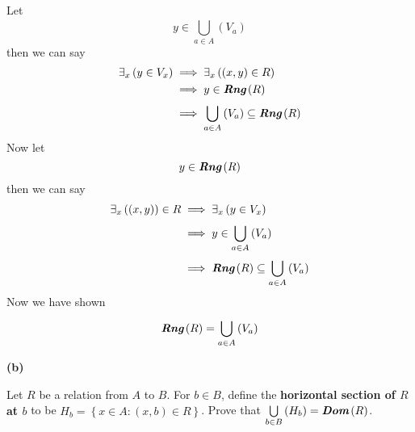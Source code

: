 \documentclass{article}
\newcommand{\sectionheading}[1]{\noindent\textbf{#1}

}
\let\bigunion\bigcup
\newcommand{\unionfrom}[3]{\bigunion\limits_{#1}^{#2} \left( {#3} \right)}
\newcommand{\unionacross}[2]{\unionfrom{#1}{}{#2}}
\newcommand{\set}[1]{\left\{ {#1} \right\}}
\newcommand{\setbuilder}[2]{\set{#1 : #2}}
\newcommand{\Exists}[2]{\exists_{#1}\left( {#2} \right)}
\newcommand{\range}[1]{\textit{\textbf{Rng}}\left( #1 \right)}
\newcommand{\domain}[1]{\textit{\textbf{Dom}}\left( #1 \right)}
\begin{document}
Let \[y\in \unionacross{a\in A}{V_a}\]
then we can say
\begin{align*}
\Exists{x}{y\in V_x} &\implies \Exists{x}{(x,y)\in R}\\
&\implies y \in \range{R}\\
&\implies \unionacross{a\in A}{V_a} \subseteq \range{R}
\end{align*}
Now let \[y \in \range{R}\]
then we can say
\begin{align*}
\Exists{x}{(x,y)} \in R &\implies \Exists{x}{y\in V_x} \\
&\implies y\in\unionacross{a\in A}{V_a}\\
&\implies \range{R} \subseteq \unionacross{a\in A}{V_a}
\end{align*}
Now we have shown
\[\range{R} = \unionacross{a\in A}{V_a}\]


\medskip
\sectionheading{(b)}
Let $R$ be a relation from $A$ to $B$. For $b \in B$, define the \textbf{horizontal section of $R$ at $b$} to be $H_b=\setbuilder{x\in A}{(x,b)\in R}$. Prove that $\unionacross{b\in B}{H_b}=\domain{R}$.
\end{document}
